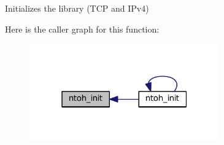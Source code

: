 Initializes the library (T\-C\-P and I\-Pv4) 



Here is the caller graph for this function\-:
\nopagebreak
\begin{figure}[H]
\begin{center}
\leavevmode
\includegraphics[width=232pt]{namespacelibntoh_ada1514e5ee06acbcbfedd22bb987c069_icgraph}
\end{center}
\end{figure}



